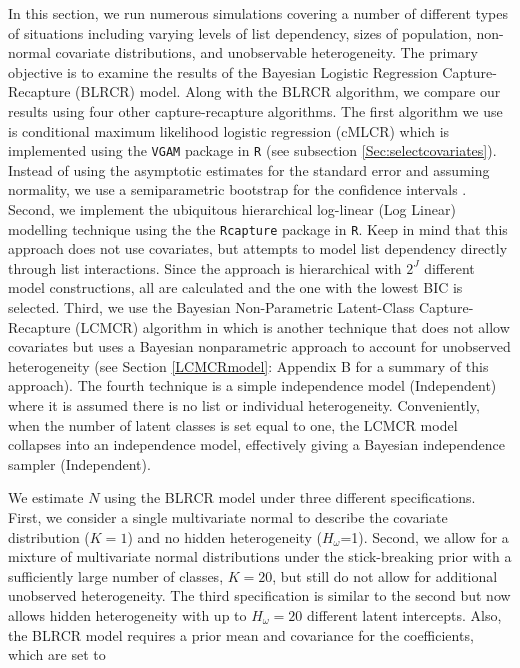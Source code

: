 \documentclass[
  12pt,
]{article}
\begin{document}
In this section, we run numerous simulations covering a number of
different types of situations including varying levels of list
dependency, sizes of population, non-normal covariate distributions, and
unobservable heterogeneity. The primary objective is to examine the
results of the Bayesian Logistic Regression Capture-Recapture (BLRCR)
model. Along with the BLRCR algorithm, we compare our results using four
other capture-recapture algorithms. The first algorithm we use is
conditional maximum likelihood logistic regression (cMLCR) which is
implemented using the \texttt{VGAM} package in \texttt{R} (see
subsection \ref{Sec:selectcovariates}). Instead of using the asymptotic
estimates for the standard error and assuming normality, we use a
semiparametric bootstrap for the confidence intervals
\citep{zwane_implementing_2003}. Second, we implement the ubiquitous
hierarchical log-linear (Log Linear) modelling technique
\citep{fienberg_multiple_1972} using the the \texttt{Rcapture} package
in \texttt{R}. Keep in mind that this approach does not use covariates,
but attempts to model list dependency directly through list
interactions. Since the approach is hierarchical with \(2^J\) different
model constructions, all are calculated and the one with the lowest BIC
is selected. Third, we use the Bayesian Non-Parametric Latent-Class
Capture-Recapture (LCMCR) algorithm in
\cite{manriquevallier_bayesian_2016} which is another technique that
does not allow covariates but uses a Bayesian nonparametric approach to
account for unobserved heterogeneity (see Section \ref{LCMCRmodel}:
Appendix B for a summary of this approach). The fourth technique is a
simple independence model (Independent) where it is assumed there is no
list or individual heterogeneity. Conveniently, when the number of
latent classes is set equal to one, the LCMCR model collapses into an
independence model, effectively giving a Bayesian independence sampler
(Independent).

We estimate \(N\) using the BLRCR model under three different
specifications. First, we consider a single multivariate normal to
describe the covariate distribution (\(K=1\)) and no hidden
heterogeneity (\(H_\omega\)=1). Second, we allow for a mixture of
multivariate normal distributions under the stick-breaking prior with a
sufficiently large number of classes, \(K=20\), but still do not allow
for additional unobserved heterogeneity. The third specification is
similar to the second but now allows hidden heterogeneity with up to
\(H_\omega=20\) different latent intercepts. Also, the BLRCR model
requires a prior mean and covariance for the coefficients, which are set
to
\end{document}
